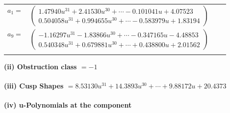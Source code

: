 \documentclass[1p]{elsarticle_modified}
\theoremstyle{definition}
\begin{document}
\begin{tabular}{m{7pt} m{180pt} m{7pt} m{180pt} }
\flushright $a_{1}=$&$\begin{pmatrix}1.47940 u^{31}+2.41530 u^{30}+\cdots-0.101041 u+4.07523\\0.504058 u^{31}+0.994655 u^{30}+\cdots-0.583979 u+1.83194\end{pmatrix}$ \\
\flushright $a_{9}=$&$\begin{pmatrix}-1.16297 u^{31}-1.83866 u^{30}+\cdots-0.347165 u-4.48853\\0.540348 u^{31}+0.679881 u^{30}+\cdots+0.438800 u+2.01562\end{pmatrix}$\\&\end{tabular}
\flushleft \textbf{(ii) Obstruction class $= -1$}\\~\\
\flushleft \textbf{(iii) Cusp Shapes $= 8.53130 u^{31}+14.3893 u^{30}+\cdots+9.88172 u+20.4373$}\\~\\
\newpage\renewcommand{\arraystretch}{1}
\flushleft \textbf{(iv) u-Polynomials at the component}\newline \\
\end{document}
